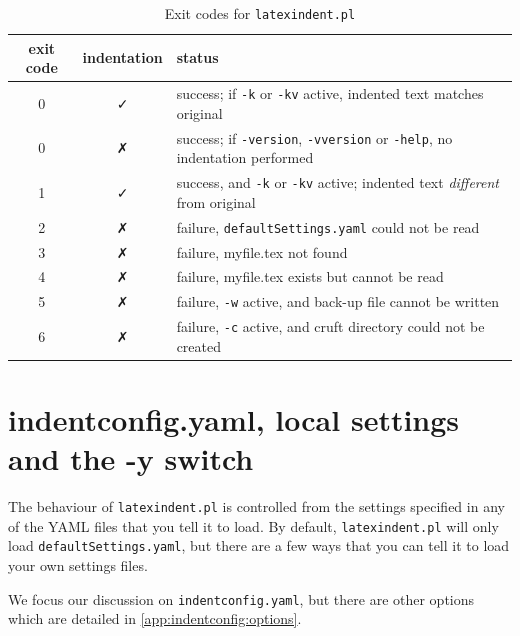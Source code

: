 \documentclass[10pt]{article}
\begin{document}
 \begin{table}[!htb]
  \caption{Exit codes for \texttt{latexindent.pl}}
  \label{tab:exit-codes}
  \begin{tabular}{ccl}
   \toprule
   exit code & indentation & status                                                                                        \\
   \midrule
   0         & \faCheck    & success; if \texttt{-k} or \texttt{-kv} active, indented text matches original                \\
   0         & \faClose    & success; if \texttt{-version}, \texttt{-vversion} or \texttt{-help}, no indentation performed \\
   1         & \faCheck    & success, and \texttt{-k} or \texttt{-kv} active; indented text \emph{different} from original \\
   \midrule
   2         & \faClose    & failure, \texttt{defaultSettings.yaml} could not be read                                      \\
   3         & \faClose    & failure, myfile.tex not found                                                                 \\
   4         & \faClose    & failure, myfile.tex exists but cannot be read                                                 \\
   5         & \faClose    & failure, \texttt{-w} active, and back-up file cannot be written                               \\
   6         & \faClose    & failure, \texttt{-c} active, and cruft directory could not be created                         \\
   \bottomrule
  \end{tabular}
 \end{table}
\section{indentconfig.yaml, local settings and the -y switch }\label{sec:indentconfig}
 The behaviour of \texttt{latexindent.pl} is controlled from the settings specified in
 any of the YAML files that you tell it to load. By default, \texttt{latexindent.pl} will
 only load \texttt{defaultSettings.yaml}, but there are a few ways that you can tell it
 to load your own settings files.

 We focus our discussion on \texttt{indentconfig.yaml}, but there are other options which
 are detailed in \cref{app:indentconfig:options}. 
\end{document}
